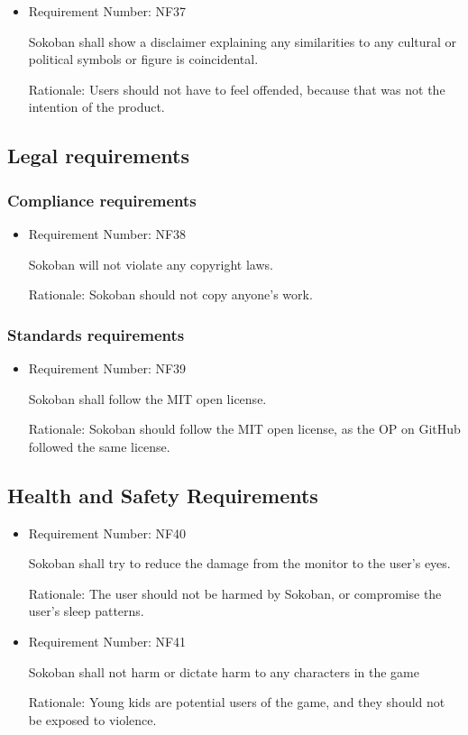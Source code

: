 \documentclass[12pt, titlepage]{article}
\begin{document}
\begin{itemize}
    \item Requirement Number: NF37
    
Sokoban shall show a disclaimer explaining any similarities to any cultural or political symbols or figure is coincidental. 
     
    Rationale: Users should not have to feel offended, because that was not the intention of the product.
\end{itemize}

\subsection{Legal requirements}

\subsubsection{Compliance requirements}

\begin{itemize}
    \item Requirement Number: NF38
    
Sokoban will not violate any copyright laws.
     
    Rationale: Sokoban should not copy anyone's work.
\end{itemize}


\subsubsection{Standards requirements}
\begin{itemize}
    \item Requirement Number: NF39
    
Sokoban shall follow the MIT open license.
     
    Rationale: Sokoban should follow the MIT open license, as the OP on GitHub followed the same license.
\end{itemize}

\subsection{Health and Safety Requirements}
\begin{itemize}
    \item Requirement Number: NF40
    
Sokoban shall try to reduce the damage from the monitor to the user's eyes.
     
    Rationale: The user should not be harmed by Sokoban, or compromise the user's sleep patterns.
    
    \item Requirement Number: NF41
    
Sokoban shall not harm or dictate harm to any characters in the game

    Rationale: Young kids are potential users of the game, and they should not be exposed to violence.
\end{itemize}
\end{document}
